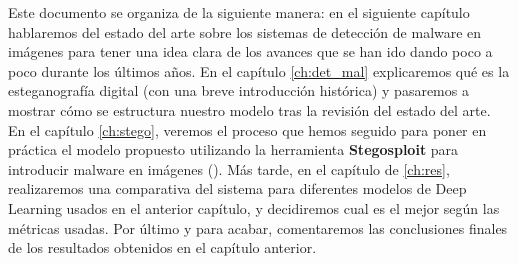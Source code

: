 Este documento se organiza de la siguiente manera: en el siguiente capítulo hablaremos del estado del arte sobre los sistemas de detección de malware en imágenes para tener una idea clara de los avances que se han ido dando poco a poco durante los últimos años. En el capítulo \ref{ch:det_mal} explicaremos qué es la esteganografía digital (con una breve introducción histórica) y pasaremos a mostrar cómo se estructura nuestro modelo tras la revisión del estado del arte. En el capítulo \ref{ch:stego}, veremos el proceso que hemos seguido para poner en práctica el modelo propuesto utilizando la herramienta \textbf{Stegosploit} para introducir malware en imágenes (\cite{stegosploit}). Más tarde, en el capítulo de \ref{ch:res}, realizaremos una comparativa del sistema para diferentes modelos de Deep Learning usados en el anterior capítulo, y decidiremos cual es el mejor según las métricas usadas. Por último y para acabar, comentaremos las conclusiones finales de los resultados obtenidos en el capítulo anterior. %